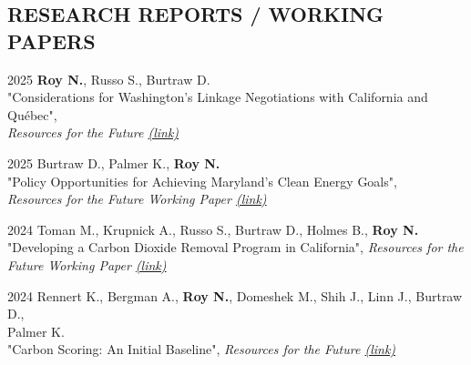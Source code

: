 \documentclass[margin]{res}
\begin{document}
\begin{resume}
\section{RESEARCH REPORTS / WORKING \\ PAPERS}
2025 \hspace{4mm}%
\textbf{Roy N.}, Russo S., Burtraw D.\\ \hspace*{16mm}  "Considerations for Washington’s Linkage Negotiations with California and Québec", \\ \hspace*{16mm}  \textit{Resources for the Future \href{https://www.rff.org/publications/reports/considerations-for-washingtons-linkage-negotiations-with-california-and-quebec/}{(link)}}

2025 \hspace{4mm}%
Burtraw D., Palmer K., \textbf{Roy N.} \\ \hspace*{16mm}  "Policy Opportunities for Achieving Maryland’s Clean Energy Goals", \\ \hspace*{16mm}  \textit{Resources for the Future Working Paper \href{https://www.rff.org/publications/working-papers/policy-opportunities-for-achieving-marylands-clean-energy-goals/}{(link)}}

2024 \hspace{4mm}%
Toman M., Krupnick A., Russo S., Burtraw D., Holmes B., \textbf{Roy N.} \\ \hspace*{16mm}  "Developing a Carbon Dioxide Removal Program in California",   \textit{Resources for the \\ \hspace*{16mm}Future Working Paper \href{https://www.rff.org/publications/working-papers/developing-a-carbon-dioxide-removal-program-in-california/}{(link)}}

2024 \hspace{4mm}%
Rennert K., Bergman A., \textbf{Roy N.}, Domeshek M., Shih J., Linn J., Burtraw D., \\ \hspace*{11mm} Palmer K. \\ \hspace*{16mm}  "Carbon Scoring: An Initial Baseline",   \textit{Resources for the Future \href{https://www.rff.org/publications/carbon-scores/carbon-scoring-initial-baseline/}{(link)}}


\end{resume}
\end{document}
